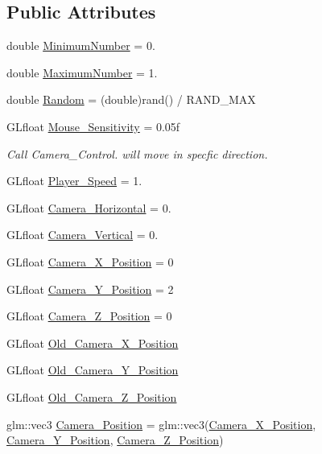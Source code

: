 \subsection*{Public Attributes}
\begin{DoxyCompactItemize}
\item 
double \hyperlink{class_game_world_a54ccf4cf03172ab8779e9c326c8846ed}{Minimum\+Number} = 0.
\item 
double \hyperlink{class_game_world_a1cddcf233625a98581eaeb9fd7c8c574}{Maximum\+Number} = 1.
\item 
double \hyperlink{class_game_world_a56652cc9880b3ba1be61395066c863c3}{Random} = (double)rand() / R\+A\+N\+D\+\_\+\+M\+A\+X
\item 
G\+Lfloat \hyperlink{class_game_world_a9bf4eb977e6ab9299aaef1345c4fa4dd}{Mouse\+\_\+\+Sensitivity} = 0.\+05f
\begin{DoxyCompactList}\small\item\em Call Camera\+\_\+\+Control. will move in specfic direction. \end{DoxyCompactList}\item 
G\+Lfloat \hyperlink{class_game_world_ae8ab2ac372729cec44ea316f6bdf45ca}{Player\+\_\+\+Speed} = 1.
\item 
G\+Lfloat \hyperlink{class_game_world_a7f4911dda9b3b4e4eb03ece87e16cd96}{Camera\+\_\+\+Horizontal} = 0.
\item 
G\+Lfloat \hyperlink{class_game_world_a26658e739c4d267b1be35ed820089931}{Camera\+\_\+\+Vertical} = 0.
\item 
G\+Lfloat \hyperlink{class_game_world_ad07b1f650edb08ddb05e74a22588bda0}{Camera\+\_\+\+X\+\_\+\+Position} = 0
\item 
G\+Lfloat \hyperlink{class_game_world_ae3e7cab30494ff5a8e91dfa7406deb16}{Camera\+\_\+\+Y\+\_\+\+Position} = 2
\item 
G\+Lfloat \hyperlink{class_game_world_ad993ea24fbacfc98410894078e916927}{Camera\+\_\+\+Z\+\_\+\+Position} = 0
\item 
G\+Lfloat \hyperlink{class_game_world_a734c19bd480aef2a7af005e170d3d523}{Old\+\_\+\+Camera\+\_\+\+X\+\_\+\+Position}
\item 
G\+Lfloat \hyperlink{class_game_world_ac1c9de2db7cb175f7a039a9f825190fc}{Old\+\_\+\+Camera\+\_\+\+Y\+\_\+\+Position}
\item 
G\+Lfloat \hyperlink{class_game_world_acf69fc81410f4bb31d03b7551eb0bced}{Old\+\_\+\+Camera\+\_\+\+Z\+\_\+\+Position}
\item 
glm\+::vec3 \hyperlink{class_game_world_ad80e597474ea4c52a583e81788187571}{Camera\+\_\+\+Position} = glm\+::vec3(\hyperlink{class_game_world_ad07b1f650edb08ddb05e74a22588bda0}{Camera\+\_\+\+X\+\_\+\+Position}, \hyperlink{class_game_world_ae3e7cab30494ff5a8e91dfa7406deb16}{Camera\+\_\+\+Y\+\_\+\+Position}, \hyperlink{class_game_world_ad993ea24fbacfc98410894078e916927}{Camera\+\_\+\+Z\+\_\+\+Position})

\end{DoxyCompactItemize}
